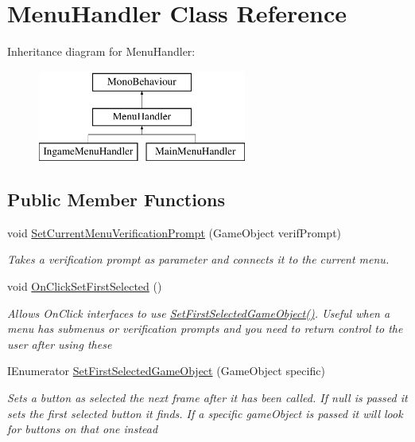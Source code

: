 \hypertarget{class_menu_handler}{}\section{Menu\+Handler Class Reference}
\label{class_menu_handler}
Inheritance diagram for Menu\+Handler\+:\begin{figure}[H]
\begin{center}
\leavevmode
\includegraphics[height=3.000000cm]{class_menu_handler}
\end{center}
\end{figure}
\subsection*{Public Member Functions}
\begin{DoxyCompactItemize}
\item 
void \hyperlink{class_menu_handler_a9273b435b2f88cd308fc1bd8120f733d}{Set\+Current\+Menu\+Verification\+Prompt} (Game\+Object verif\+Prompt)
\begin{DoxyCompactList}\small\item\em Takes a verification prompt as parameter and connects it to the current menu. \end{DoxyCompactList}\item 
void \hyperlink{class_menu_handler_a94e4c33184497dd1ec9d1088f8b29d6f}{On\+Click\+Set\+First\+Selected} ()
\begin{DoxyCompactList}\small\item\em Allows On\+Click interfaces to use \hyperlink{class_menu_handler_a9a847d363279e4b969a3584ee4134e50}{Set\+First\+Selected\+Game\+Object()}. Useful when a menu has submenus or verification prompts and you need to return control to the user after using these \end{DoxyCompactList}\item 
I\+Enumerator \hyperlink{class_menu_handler_a9a847d363279e4b969a3584ee4134e50}{Set\+First\+Selected\+Game\+Object} (Game\+Object specific)
\begin{DoxyCompactList}\small\item\em Sets a button as selected the next frame after it has been called. If null is passed it sets the first selected button it finds. If a specific game\+Object is passed it will look for buttons on that one instead \end{DoxyCompactList}\end{DoxyCompactItemize}
